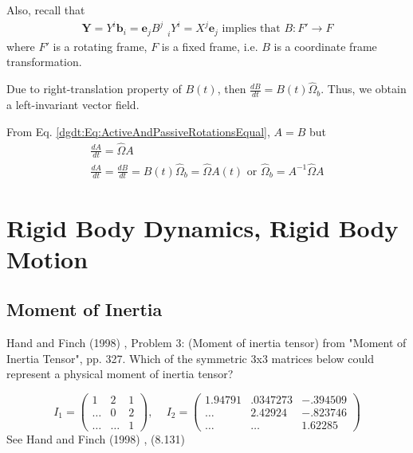 Also, recall that
\[
\begin{gathered}
	\mathbf{Y} = Y^i \mathbf{b}_i = \mathbf{e}_j B^j_{\quad i} Y^i = X^j \mathbf{e}_j \text{ implies that } B:F' \to F
\end{gathered}
\]
where $F'$ is a rotating frame, $F$ is a fixed frame, i.e. $B$ is a coordinate frame transformation.

Due to right-translation property of $B(t)$, then $\frac{dB}{dt} = B(t) \widehat{\Omega}_b$. Thus, we obtain a left-invariant vector field.

From Eq. \ref{dgdt:Eq:ActiveAndPassiveRotationsEqual}, $A = B$ but
\begin{equation}
	\begin{gathered}
		\frac{dA}{dt} = \widehat{\Omega} A \\
		\frac{dA}{dt} = \frac{dB}{dt} = B(t) \widehat{\Omega}_b = \widehat{\Omega}A(t) \text{ or } \widehat{\Omega}_b = A^{-1} \widehat{\Omega} A
	\end{gathered}
\end{equation}

\section{Rigid Body Dynamics, Rigid Body Motion}

\subsection{Moment of Inertia}

Hand and Finch (1998) \cite{dgdt:HaFi1998}, Problem 3: (Moment of inertia tensor) from "Moment of Inertia Tensor", pp. 327. Which of the symmetric 3x3 matrices below could represent a physical moment of inertia tensor?

\begin{equation}
I_1 = \left( \begin{matrix} 1 & 2 & 1 \\ \dots & 0 & 2 \\ \dots & \dots & 1 \end{matrix}\right), \quad \, I_2 = \left( \begin{matrix} 1.94791 & .0347273 & -.394509 \\ \dots & 2.42924 & -.823746 \\ \dots & \dots & 1.62285 \end{matrix} \right)
\end{equation} See Hand and Finch (1998) \cite{dgdt:HaFi1998}, (8.131)

